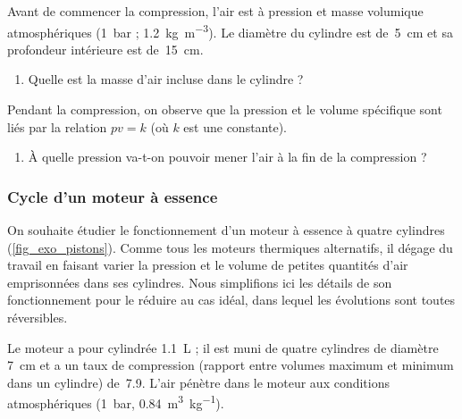	Avant de commencer la compression, l’air est à pression et masse volumique atmosphériques (\SI{1}{\bar} ; \SI{1,2}{\kilogram\per\metre\cubed}). Le diamètre du cylindre est de~\SI{5}{\centi\metre} et sa profondeur intérieure est de~\SI{15}{\centi\metre}.
	
	\begin{enumerate}
		\item Quelle est la masse d’air incluse dans le cylindre ?
	\end{enumerate}


	Pendant la compression, on observe que la pression et le volume spécifique sont liés par la relation $p v = k$ (où $k$ est une constante). 

	\begin{enumerate}
		\item À quelle pression va-t-on pouvoir mener l’air à la fin de la compression ?
	\end{enumerate}


\subsubsection{Cycle d’un moteur à essence}
\label{exo_cycle_moteur_essence}

	On souhaite étudier le fonctionnement d’un moteur à essence à quatre cylindres (\cref{fig_exo_pistons}). Comme tous les moteurs thermiques alternatifs, il dégage du travail en faisant varier la pression et le volume de petites quantités d’air emprisonnées dans ses cylindres. Nous simplifions ici les détails de son fonctionnement pour le réduire au cas idéal, dans lequel les évolutions sont toutes réversibles.
	
	Le moteur a pour cylindrée \SI{1,1}{\liter} ; il est muni de quatre cylindres de diamètre \SI{7}{\centi\metre} et a un taux de compression (rapport entre volumes maximum et minimum dans un cylindre) de~\num{7,9}. L’air pénètre dans le moteur aux conditions atmosphériques (\SI{1}{\bar}, \SI{0,84}{\metre\cubed\per\kilogram}).
	
